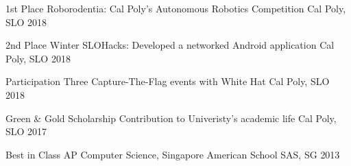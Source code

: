 



\begin{cvhonors}

  \cvhonor
    {1st Place} %
    {Roborodentia: Cal Poly's Autonomous Robotics Competition} %
    {Cal Poly, SLO} %
    {2018} %

  \cvhonor
    {2nd Place} %
    {Winter SLOHacks: Developed a networked Android application} %
    {Cal Poly, SLO} %
    {2018} %

  \cvhonor
    {Participation} %
    {Three Capture-The-Flag events with White Hat} %
    {Cal Poly, SLO} %
    {2018} %


\end{cvhonors}




\begin{cvhonors}

  \cvhonor
    {Green \& Gold Scholarship} %
    {Contribution to Univeristy's academic life} %
    {Cal Poly, SLO} %
    {2017} %

  \cvhonor
    {Best in Class} %
    {AP Computer Science, Singapore American School} %
    {SAS, SG} %
    {2013} %


\end{cvhonors}

